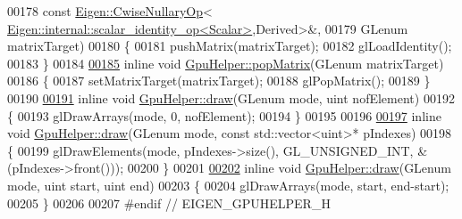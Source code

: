 \begin{DoxyCode}
00178     \textcolor{keyword}{const} \hyperlink{group___core___module_class_eigen_1_1_cwise_nullary_op}{Eigen::CwiseNullaryOp}<
      \hyperlink{struct_eigen_1_1internal_1_1scalar__identity__op}{Eigen::internal::scalar\_identity\_op<Scalar>},Derived>&,
00179     GLenum matrixTarget)
00180 \{
00181     pushMatrix(matrixTarget);
00182     glLoadIdentity();
00183 \}
00184 
\hyperlink{class_gpu_helper_aad0cc23c2eaf0dcc610b180e5c8b195e}{00185} \textcolor{keyword}{inline} \textcolor{keywordtype}{void} \hyperlink{class_gpu_helper_aad0cc23c2eaf0dcc610b180e5c8b195e}{GpuHelper::popMatrix}(GLenum matrixTarget)
00186 \{
00187     setMatrixTarget(matrixTarget);
00188     glPopMatrix();
00189 \}
00190 
\hyperlink{class_gpu_helper_a154eb0bf7bf7c764dccb874ce38af766}{00191} \textcolor{keyword}{inline} \textcolor{keywordtype}{void} \hyperlink{class_gpu_helper_a154eb0bf7bf7c764dccb874ce38af766}{GpuHelper::draw}(GLenum mode, uint nofElement)
00192 \{
00193     glDrawArrays(mode, 0, nofElement);
00194 \}
00195 
00196 
\hyperlink{class_gpu_helper_a2fe175b94cd2566fdf9645067b9dd69e}{00197} \textcolor{keyword}{inline} \textcolor{keywordtype}{void} \hyperlink{class_gpu_helper_a154eb0bf7bf7c764dccb874ce38af766}{GpuHelper::draw}(GLenum mode, \textcolor{keyword}{const} std::vector<uint>* pIndexes)
00198 \{
00199     glDrawElements(mode, pIndexes->size(), GL\_UNSIGNED\_INT, &(pIndexes->front()));
00200 \}
00201 
\hyperlink{class_gpu_helper_a4450191786c5b0533d4bc291d2b6ce19}{00202} \textcolor{keyword}{inline} \textcolor{keywordtype}{void} \hyperlink{class_gpu_helper_a154eb0bf7bf7c764dccb874ce38af766}{GpuHelper::draw}(GLenum mode, uint start, uint end)
00203 \{
00204     glDrawArrays(mode, start, end-start);
00205 \}
00206 
00207 \textcolor{preprocessor}{#endif // EIGEN\_GPUHELPER\_H}
\end{DoxyCode}
